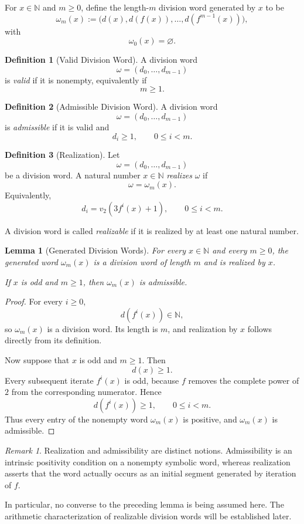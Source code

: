 \documentclass[12pt, oneside]{article}
\numberwithin{equation}{section}
\theoremstyle{definition}
\newtheorem{definition}{Definition}[section]
\theoremstyle{plain}
\newtheorem{lemma}[theorem]{Lemma}
\theoremstyle{remark}
\newtheorem*{remark}{Remark}
\begin{document}
For \(x\in\mathbb N\) and \(m\ge0\), define the length-\(m\) division
word generated by \(x\) to be
\[
\omega_m(x)
:=
\bigl(
d(x),d(f(x)),\dots,d(f^{m-1}(x))
\bigr),
\]
with
\[
\omega_0(x)=\varnothing.
\]

\begin{definition}[Valid Division Word]
A division word
\[
\omega=(d_0,\dots,d_{m-1})
\]
is \emph{valid} if it is nonempty, equivalently if
\[
m\ge1.
\]
\end{definition}

\begin{definition}[Admissible Division Word]
A division word
\[
\omega=(d_0,\dots,d_{m-1})
\]
is \emph{admissible} if it is valid and
\[
d_i\ge1,
\qquad
0\le i<m.
\]
\end{definition}

\begin{definition}[Realization]
Let
\[
\omega=(d_0,\dots,d_{m-1})
\]
be a division word. A natural number \(x\in\mathbb N\) \emph{realizes}
\(\omega\) if
\[
\omega=\omega_m(x).
\]
Equivalently,
\[
d_i=v_2\!\left(3f^i(x)+1\right),
\qquad
0\le i<m.
\]
\end{definition}

A division word is called \emph{realizable} if it is realized by at least
one natural number.

\begin{lemma}[Generated Division Words]
\label{lem:generated-division-words}
For every \(x\in\mathbb N\) and every \(m\ge0\), the generated word
\(\omega_m(x)\) is a division word of length \(m\) and is realized by
\(x\).

If \(x\) is odd and \(m\ge1\), then \(\omega_m(x)\) is admissible.
\end{lemma}

\begin{proof}
For every \(i\ge0\),
\[
d(f^i(x))\in\mathbb N,
\]
so \(\omega_m(x)\) is a division word. Its length is \(m\), and realization
by \(x\) follows directly from its definition.

Now suppose that \(x\) is odd and \(m\ge1\). Then
\[
d(x)\ge1.
\]
Every subsequent iterate \(f^i(x)\) is odd, because \(f\) removes the
complete power of \(2\) from the corresponding numerator. Hence
\[
d(f^i(x))\ge1,
\qquad
0\le i<m.
\]
Thus every entry of the nonempty word \(\omega_m(x)\) is positive, and
\(\omega_m(x)\) is admissible.
\end{proof}

\begin{remark}
Realization and admissibility are distinct notions. Admissibility is an
intrinsic positivity condition on a nonempty symbolic word, whereas
realization asserts that the word actually occurs as an initial segment
generated by iteration of \(f\).

In particular, no converse to the preceding lemma is being assumed here.
The arithmetic characterization of realizable division words will be
established later.
\end{remark}
\end{document}
